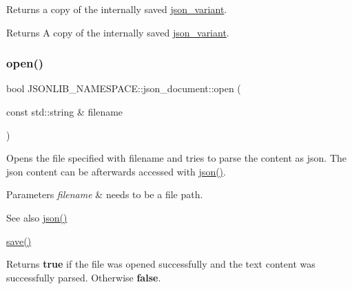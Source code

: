 Returns a copy of the internally saved \hyperlink{classJSONLIB__NAMESPACE_1_1json__variant}{json\+\_\+variant}. 

\begin{DoxyReturn}{Returns}
A copy of the internally saved \hyperlink{classJSONLIB__NAMESPACE_1_1json__variant}{json\+\_\+variant}. 
\end{DoxyReturn}
\mbox{\label{classJSONLIB__NAMESPACE_1_1json__document_a20dc761125ccf91f7747f28a7c356be7}} 
\subsubsection{\texorpdfstring{open()}{open()}\hspace{0.1cm}{\footnotesize\ttfamily [1/2]}}
{\footnotesize\ttfamily bool J\+S\+O\+N\+L\+I\+B\+\_\+\+N\+A\+M\+E\+S\+P\+A\+C\+E\+::json\+\_\+document\+::open (\begin{DoxyParamCaption}\item[{const std\+::string \&}]{filename }\end{DoxyParamCaption})}



Opens the file specified with {\ttfamily filename} and tries to parse the content as json. The json content can be afterwards accessed with \hyperlink{classJSONLIB__NAMESPACE_1_1json__document_ad87b8e7d68ba854dbd730758273a3b93}{json()}. 


\begin{DoxyParams}{Parameters}
{\em filename} & needs to be a file path. \\
\hline
\end{DoxyParams}
\begin{DoxySeeAlso}{See also}
\hyperlink{classJSONLIB__NAMESPACE_1_1json__document_ad87b8e7d68ba854dbd730758273a3b93}{json()} 

\hyperlink{classJSONLIB__NAMESPACE_1_1json__document_af8f392a0ffc779277ead1f2bdb222930}{save()} 
\end{DoxySeeAlso}
\begin{DoxyReturn}{Returns}
{\bfseries true} if the file was opened successfully and the text content was successfully parsed. Otherwise {\bfseries false}. 
\end{DoxyReturn}
\mbox{\label{classJSONLIB__NAMESPACE_1_1json__document_a08e509059e628742f35716dddce2d740}} 
